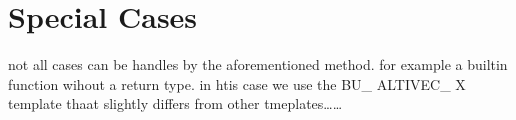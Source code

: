 \chapter{Special Cases}
\label{chapter:special cases}

not all cases can be handles by the aforementioned method. for example a builtin function wihout a return type. in  htis case we use the BU\_ ALTIVEC\_ X template thaat slightly differs from other tmeplates……


